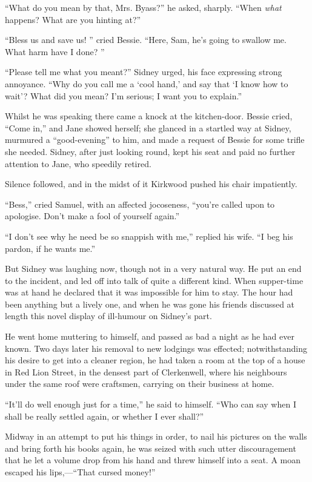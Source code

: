``What do you mean by that, Mrs. Byass?'' he asked, sharply. ``When
\emph{what} happens? What are you hinting at?''

``Bless us and save us! '' cried Bessie. ``Here, Sam, he's going to
swallow me. What harm have I done? ''

``Please tell me what you meant?'' Sidney urged, his face expressing
strong annoyance. ``Why do you call me a `cool hand,' and say that `I
know how to wait'? What did you mean? I'm serious; I want you to
explain.''

Whilst he was speaking there came a knock at the kitchen-door. Bessie
cried, ``Come in,'' and Jane showed herself; she
{\protect\hypertarget{269}{}{}}glanced in a startled way at Sidney,
murmured a ``good-evening'' to him, and made a request of Bessie for
some trifle she needed. Sidney, after just looking round, kept his seat
and paid no further attention to Jane, who speedily retired.

Silence followed, and in the midst of it Kirkwood pushed his chair
impatiently.

``Bess,'' cried Samuel, with an affected jocoseness, ``you're called
upon to apologise. Don't make a fool of yourself again.''

``I don't see why he need be so snappish with me,'' replied his wife.
``I beg his pardon, if he wants me.''

But Sidney was laughing now, though not in a very natural way. He put an
end to the incident, and led off into talk of quite a different kind.
When supper-time was at hand he declared that it was impossible for him
to stay. The hour had been anything but a lively one, and when he was
gone his friends discussed at length this novel display of ill-humour on
Sidney's part.

He went home muttering to himself, and
{\protect\hypertarget{270}{}{}}passed as bad a night as he had ever
known. Two days later his removal to new lodgings was effected;
notwithstanding his desire to get into a cleaner region, he had taken a
room at the top of a house in Red Lion Street, in the densest part of
Clerkenwell, where his neighbours under the same roof were craftsmen,
carrying on their business at home.

``It'll do well enough just for a time,'' he said to himself. ``Who can
say when I shall be really settled again, or whether I ever shall?''

Midway in an attempt to put his things in order, to nail his pictures on
the walls and bring forth his books again, he was seized with such utter
discouragement that he let a volume drop from his hand and threw himself
into a seat. A moan escaped his lips,---``That cursed money!''

